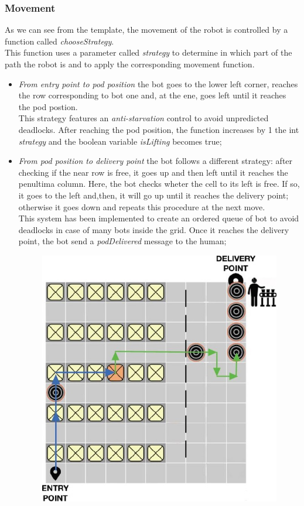 \documentclass[10pt,a4paper]{article}
\begin{document}
			\subsubsection{Movement}
				As we can see from the template, the movement of the robot is controlled by a function called \emph{chooseStrategy}.\\
				This function uses a parameter called \emph{strategy} to determine in which part of the path the robot is and to apply the corresponding movement function.\\
				\begin{itemize}
					\item \emph{From entry point to pod position} the bot goes to the lower left corner, reaches the row corresponding to bot one and, at the ene, goes left until it reaches the pod postion.\\This strategy features an \emph{anti-starvation} control to avoid unpredicted deadlocks. After reaching the pod position, the function increases by 1 the int \emph{strategy} and the boolean variable \emph{isLifting} becomes true;
					\item \emph{From pod position to delivery point} the bot follows a different strategy: after checking if the near row is free, it goes up and then left until it reaches the penultima column. Here, the bot checks wheter the cell to its left is free. If so, it goes to the left and,then, it will go up until it reaches the delivery point; otherwise it goes down and repeats this procedure at the next move.\\This system has been implemented to create an ordered queue of bot to avoid deadlocks in case of many bots inside the grid. Once it reaches the delivery point, the bot send a \emph{podDelivered} message to the human;
					\begin{figure}[ht]
						\centering
						\includegraphics[scale = 0.36]{Images/BotMovement1.JPG}

\end{figure}
\end{itemize}
\end{document}
